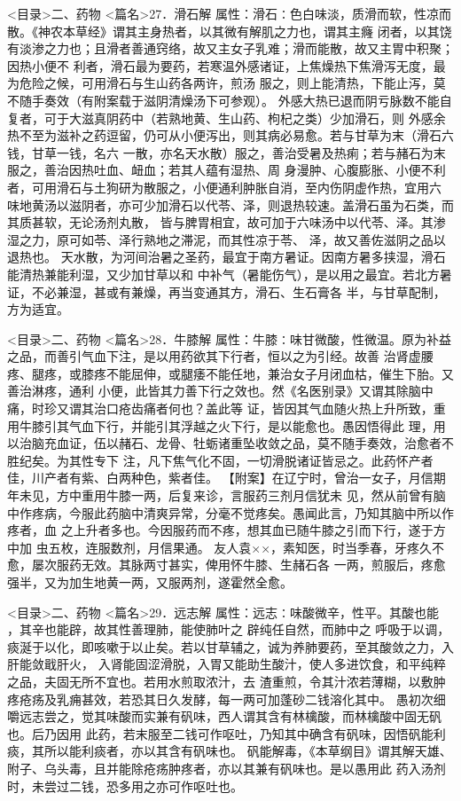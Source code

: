 \documentclass[a4paper,12pt,UTF8,twoside]{ctexbook}
\begin{document}
<目录>二、药物
<篇名>27．滑石解
属性：滑石∶色白味淡，质滑而软，性凉而散。《神农本草经》谓其主身热者，以其微有解肌之力也，谓其主癃 
闭者，以其饶有淡渗之力也；且滑者善通窍络，故又主女子乳难；滑而能散，故又主胃中积聚；因热小便不 
利者，滑石最为要药，若寒温外感诸证，上焦燥热下焦滑泻无度，最为危险之候，可用滑石与生山药各两许，煎汤 
服之，则上能清热，下能止泻，莫不随手奏效（有附案载于滋阴清燥汤下可参观）。 
外感大热已退而阴亏脉数不能自复者，可于大滋真阴药中（若熟地黄、生山药、枸杞之类）少加滑石，则 
外感余热不至为滋补之药逗留，仍可从小便泻出，则其病必易愈。若与甘草为末（滑石六钱，甘草一钱，名六 
一散，亦名天水散）服之，善治受暑及热痢；若与赭石为末服之，善治因热吐血、衄血；若其人蕴有湿热、周 
身漫肿、心腹膨胀、小便不利者，可用滑石与土狗研为散服之，小便通利肿胀自消，至内伤阴虚作热，宜用六 
味地黄汤以滋阴者，亦可少加滑石以代苓、泽，则退热较速。盖滑石虽为石类，而其质甚软，无论汤剂丸散， 
皆与脾胃相宜，故可加于六味汤中以代苓、泽。其渗湿之力，原可如苓、泽行熟地之滞泥，而其性凉于苓、 
泽，故又善佐滋阴之品以退热也。 
天水散，为河间治暑之圣药，最宜于南方暑证。因南方暑多挟湿，滑石能清热兼能利湿，又少加甘草以和 
中补气（暑能伤气），是以用之最宜。若北方暑证，不必兼湿，甚或有兼燥，再当变通其方，滑石、生石膏各 
半，与甘草配制，方为适宜。 

<目录>二、药物
<篇名>28．牛膝解
属性：牛膝∶味甘微酸，性微温。原为补益之品，而善引气血下注，是以用药欲其下行者，恒以之为引经。故善 
治肾虚腰疼、腿疼，或膝疼不能屈伸，或腿痿不能任地，兼治女子月闭血枯，催生下胎。又善治淋疼，通利 
小便，此皆其力善下行之效也。然《名医别录》又谓其除脑中痛，时珍又谓其治口疮齿痛者何也？盖此等 
证，皆因其气血随火热上升所致，重用牛膝引其气血下行，并能引其浮越之火下行，是以能愈也。愚因悟得此 
理，用以治脑充血证，伍以赭石、龙骨、牡蛎诸重坠收敛之品，莫不随手奏效，治愈者不胜纪矣。为其性专下 
注，凡下焦气化不固，一切滑脱诸证皆忌之。此药怀产者佳，川产者有紫、白两种色，紫者佳。 
【附案】在辽宁时，曾治一女子，月信期年未见，方中重用牛膝一两，后复来诊，言服药三剂月信犹未 
见，然从前曾有脑中作疼病，今服此药脑中清爽异常，分毫不觉疼矣。愚闻此言，乃知其脑中所以作疼者，血 
之上升者多也。今因服药而不疼，想其血已随牛膝之引而下行，遂于方中加 虫五枚，连服数剂，月信果通。 
友人袁××，素知医，时当季春，牙疼久不愈，屡次服药无效。其脉两寸甚实，俾用怀牛膝、生赭石各 
一两，煎服后，疼愈强半，又为加生地黄一两，又服两剂，遂霍然全愈。 

<目录>二、药物
<篇名>29．远志解
属性：远志∶味酸微辛，性平。其酸也能 ，其辛也能辟，故其性善理肺，能使肺叶之 辟纯任自然，而肺中之 
呼吸于以调，痰涎于以化，即咳嗽于以止矣。若以甘草辅之，诚为养肺要药，至其酸敛之力，入肝能敛戢肝火， 
入肾能固涩滑脱，入胃又能助生酸汁，使人多进饮食，和平纯粹之品，夫固无所不宜也。若用水煎取浓汁，去 
渣重煎，令其汁浓若薄糊，以敷肿疼疮疡及乳痈甚效，若恐其日久发酵，每一两可加蓬砂二钱溶化其中。 
愚初次细嚼远志尝之，觉其味酸而实兼有矾味，西人谓其含有林檎酸，而林檎酸中固无矾也。后乃因用 
此药，若末服至二钱可作呕吐，乃知其中确含有矾味，因悟矾能利痰，其所以能利痰者，亦以其含有矾味也。 
矾能解毒，《本草纲目》谓其解天雄、附子、乌头毒，且并能除疮疡肿疼者，亦以其兼有矾味也。是以愚用此 
药入汤剂时，未尝过二钱，恐多用之亦可作呕吐也。 
\end{document}

